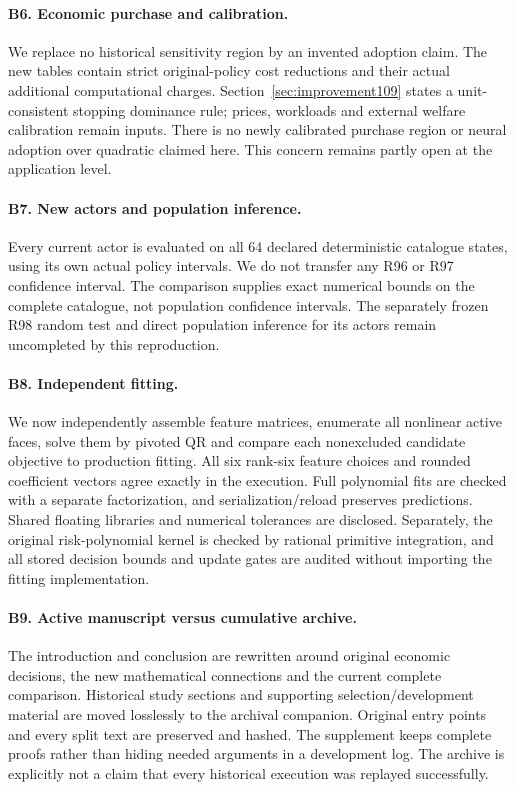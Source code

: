 \documentclass[11pt]{article}
\begin{document}
\paragraph{B6. Economic purchase and calibration.}
We replace no historical sensitivity region by an invented adoption claim. The new tables contain strict original-policy cost reductions and their actual additional computational charges. Section~\ref{sec:improvement109} states a unit-consistent stopping dominance rule; prices, workloads and external welfare calibration remain inputs. There is no newly calibrated purchase region or neural adoption over quadratic claimed here. This concern remains partly open at the application level.

\paragraph{B7. New actors and population inference.}
Every current actor is evaluated on all 64 declared deterministic catalogue states, using its own actual policy intervals. We do not transfer any R96 or R97 confidence interval. The comparison supplies exact numerical bounds on the complete catalogue, not population confidence intervals. The separately frozen R98 random test and direct population inference for its actors remain uncompleted by this reproduction.

\paragraph{B8. Independent fitting.}
We now independently assemble feature matrices, enumerate all nonlinear active faces, solve them by pivoted QR and compare each nonexcluded candidate objective to production fitting. All six rank-six feature choices and rounded coefficient vectors agree exactly in the execution. Full polynomial fits are checked with a separate factorization, and serialization/reload preserves predictions. Shared floating libraries and numerical tolerances are disclosed. Separately, the original risk-polynomial kernel is checked by rational primitive integration, and all stored decision bounds and update gates are audited without importing the fitting implementation.

\paragraph{B9. Active manuscript versus cumulative archive.}
The introduction and conclusion are rewritten around original economic decisions, the new mathematical connections and the current complete comparison. Historical study sections and supporting selection/development material are moved losslessly to the archival companion. Original entry points and every split text are preserved and hashed. The supplement keeps complete proofs rather than hiding needed arguments in a development log. The archive is explicitly not a claim that every historical execution was replayed successfully.
\end{document}
